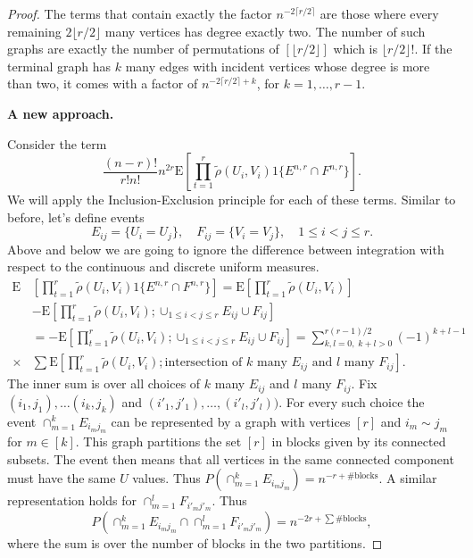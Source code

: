 \documentclass{amsart}
\newcommand{\E}{\mathrm{E}}
\begin{document}
{\begin{proof}
The terms that contain exactly the factor $n^{-2\lceil r/2 \rceil}$ are those where every remaining $2\lfloor r/2 \rfloor$ many vertices has degree exactly two. The number of such graphs are exactly the number of permutations of $[\lfloor r/2 \rfloor]$ which is $\lfloor r/2 \rfloor !$. If the terminal graph has $k$ many edges with incident vertices whose degree is more than two, it comes with a factor of $n^{-2\lceil r/2 \rceil + k}$, for $k=1, \ldots, r-1$. 

\newpage

\textbf{A new approach.}

Consider the term 
\[
\frac{(n-r)!}{r! n!} n^{2r} \E\left[ \prod_{t=1}^r \tilde{\rho}(U_i, V_i) 1\{ E^{n,r} \cap F^{n,r}\} \right].
\]
We will apply the Inclusion-Exclusion principle for each of these terms. Similar to before, let's define events 
\[
E_{ij}= \{U_i=U_j\}, \quad F_{ij}=\{V_i = V_j\}, \quad 1\le i < j \le r.
\]
Above and below we are going to ignore the difference between integration with respect to the  continuous and discrete uniform measures. 
\[
\begin{split}
    \E&\left[ \prod_{t=1}^r \tilde{\rho}(U_i, V_i) 1\{ E^{n,r} \cap F^{n,r}\} \right]= \E\left[ \prod_{t=1}^r \tilde{\rho}(U_i, V_i) \right]\\
    &- \E\left[ \prod_{t=1}^r \tilde{\rho}(U_i, V_i); \cup_{1\le i < j \le r} E_{ij} \cup F_{ij} \right]\\
    &= - \E\left[ \prod_{t=1}^r \tilde{\rho}(U_i, V_i); \cup_{1\le i < j \le r} E_{ij} \cup F_{ij} \right]=\sum_{k,l=0,\; k+l>0}^{r(r-1)/2} (-1)^{k+l-1} \\
    \times &\sum \E\left[ \prod_{t=1}^r \tilde{\rho}(U_i, V_i); \text{intersection of $k$ many $E_{ij}$ and $l$ many $F_{ij}$}  \right].
\end{split}
\]
The inner sum is over all choices of $k$ many $E_{ij}$ and $l$ many $F_{ij}$. Fix $(i_1, j_1), \ldots (i_k, j_k)$ and $(i'_1, j'_1), \ldots, (i'_l, j'_l))$. For every such choice the event $\cap_{m=1}^k E_{i_mj_m}$ can be represented by a graph with vertices $[r]$ and $i_m \sim j_m$ for $m\in [k]$. This graph partitions the set $[r]$ in blocks given by its connected subsets. The event then means that all vertices in the same connected component must have the same $U$ values. Thus $P(\cap_{m=1}^k E_{i_mj_m})= n^{-r + \#\text{blocks}}$. A similar representation holds for $\cap_{m=1}^l F_{i'_mj'_m}$. Thus 
\[
P\left(\cap_{m=1}^k E_{i_mj_m} \cap \cap_{m=1}^l F_{i'_mj'_m} \right)= n^{-2r + \sum \#\text{blocks}},
\]
where the sum is over the number of blocks in the two partitions. 






\end{proof}}
\end{document}
